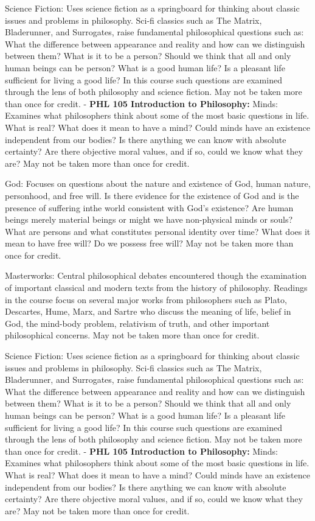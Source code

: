 \documentclass[
  letterpaper,
]{scrbook}
\begin{document}
Science Fiction: Uses science fiction as a springboard for thinking
about classic issues and problems in philosophy. Sci-fi classics such as
The Matrix, Bladerunner, and Surrogates, raise fundamental philosophical
questions such as: What the difference between appearance and reality
and how can we distinguish between them? What is it to be a person?
Should we think that all and only human beings can be person? What is a
good human life? Is a pleasant life sufficient for living a good life?
In this course such questions are examined through the lens of both
philosophy and science fiction. May not be taken more than once for
credit. - \textbf{PHL 105 Introduction to Philosophy:} Minds: Examines
what philosophers think about some of the most basic questions in life.
What is real? What does it mean to have a mind? Could minds have an
existence independent from our bodies? Is there anything we can know
with absolute certainty? Are there objective moral values, and if so,
could we know what they are? May not be taken more than once for credit.

God: Focuses on questions about the nature and existence of God, human
nature, personhood, and free will. Is there evidence for the existence
of God and is the presence of suffering inthe world consistent with
God's existence? Are human beings merely material beings or might we
have non-physical minds or souls? What are persons and what constitutes
personal identity over time? What does it mean to have free will? Do we
possess free will? May not be taken more than once for credit.

Masterworks: Central philosophical debates encountered though the
examination of important classical and modern texts from the history of
philosophy. Readings in the course focus on several major works from
philosophers such as Plato, Descartes, Hume, Marx, and Sartre who
discuss the meaning of life, belief in God, the mind-body problem,
relativism of truth, and other important philosophical concerns. May not
be taken more than once for credit.

Science Fiction: Uses science fiction as a springboard for thinking
about classic issues and problems in philosophy. Sci-fi classics such as
The Matrix, Bladerunner, and Surrogates, raise fundamental philosophical
questions such as: What the difference between appearance and reality
and how can we distinguish between them? What is it to be a person?
Should we think that all and only human beings can be person? What is a
good human life? Is a pleasant life sufficient for living a good life?
In this course such questions are examined through the lens of both
philosophy and science fiction. May not be taken more than once for
credit. - \textbf{PHL 105 Introduction to Philosophy:} Minds: Examines
what philosophers think about some of the most basic questions in life.
What is real? What does it mean to have a mind? Could minds have an
existence independent from our bodies? Is there anything we can know
with absolute certainty? Are there objective moral values, and if so,
could we know what they are? May not be taken more than once for credit.
\end{document}
